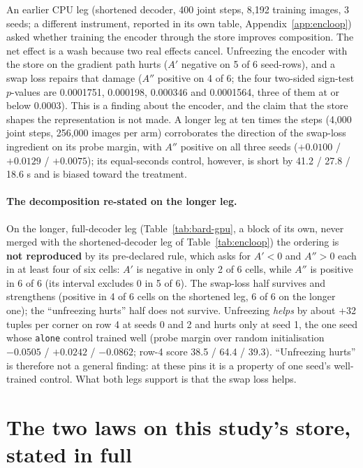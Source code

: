 \documentclass{article} %
\begin{document}
An earlier CPU leg (shortened decoder, 400 joint steps, 8,192 training images, 3 seeds; a
different instrument, reported in its own table, Appendix~\ref{app:encloop}) asked whether
training the encoder through the store improves composition. The net effect is a wash because two
real effects cancel. Unfreezing the encoder with the store on the gradient path hurts ($A'$
negative on 5 of 6 seed-rows), and a swap loss repairs that damage ($A''$ positive on 4 of 6;
the four two-sided sign-test $p$-values are 0.0001751, 0.000198, 0.000346 and 0.0001564, three
of them at or below 0.0003). This is a finding about the encoder, and the claim
that the store shapes the representation is not made. %
A longer leg at ten times the steps (4,000 joint steps, 256,000 images per arm) corroborates
the direction of the swap-loss ingredient on its probe margin, with $A''$ positive on all three
seeds ($+0.0100$ / $+0.0129$ / $+0.0075$); its equal-seconds control, however, is short by 41.2 /
27.8 / 18.6 s and is biased toward the treatment. %
\paragraph{The decomposition re-stated on the longer leg.} On the
longer, full-decoder leg (Table~\ref{tab:bard-gpu}, a block of its own, never merged with the
shortened-decoder leg of Table~\ref{tab:encloop}) the ordering is \textbf{not reproduced} by its
pre-declared rule, which asks for $A'<0$ and $A''>0$ each in at least four of six cells: $A'$ is
negative in only 2 of 6 cells, while $A''$ is positive in 6 of 6 (its interval excludes 0 in 5 of %
6). The swap-loss half survives and strengthens (positive in 4 of 6 cells on the shortened leg, 6 %
of 6 on the longer one); the ``unfreezing hurts'' half does not survive. Unfreezing \emph{helps} by
about +32 tuples per corner on row 4 at seeds 0 and 2 and hurts only at seed 1, the one seed whose %
\texttt{alone} control trained well (probe margin over random initialisation $-0.0505$ / %
$+0.0242$ / $-0.0862$; row-4 score 38.5 / 64.4 / 39.3). ``Unfreezing hurts'' is therefore not a %
general finding: at these pins it is a property of one seed's well-trained control. What both legs
support is that the swap loss helps.

\section{The two laws on this study's store, stated in full}
\label{app:laws}
\end{document}
